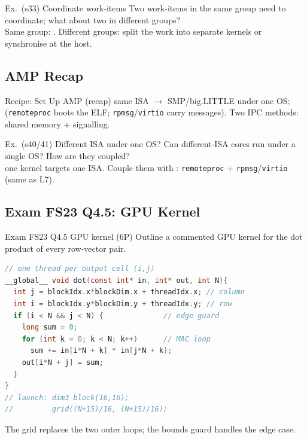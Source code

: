 \begin{example2}{Ex.\ (s33) Coordinate work-items}
    Two work-items in the same group need to coordinate; what about two in different groups?
     \\ 
    Same group: . Different groups:  split the work into separate kernels or synchronise at the host.
\end{example2}

\subsection{AMP Recap}

\begin{KR}{Recipe: Set Up AMP (recap)}
    same ISA $\to$ SMP/big.LITTLE under one OS;  (\texttt{remoteproc} boots the ELF; \texttt{rpmsg}/\texttt{virtio} carry messages). Two IPC methods: shared memory + signalling.
\end{KR}

\begin{example2}{Ex.\ (s40/41) Different ISA under one OS?}
    Can different-ISA cores run under a single OS? How are they coupled?
     \\ 
     one kernel targets one ISA. Couple them with : \texttt{remoteproc} + \texttt{rpmsg}/\texttt{virtio} (same as L7).
\end{example2}

\subsection{Exam FS23 Q4.5: GPU Kernel}

\begin{example2}{Exam FS23 Q4.5 GPU kernel (6P)}
    Outline a commented GPU kernel for the dot product of every row-vector pair.
     \\ 
\begin{lstlisting}[language=C, style=basesmol]
// one thread per output cell (i,j)
__global__ void dot(const int* in, int* out, int N){
  int j = blockIdx.x*blockDim.x + threadIdx.x; // column
  int i = blockIdx.y*blockDim.y + threadIdx.y; // row
  if (i < N && j < N) {              // edge guard
    long sum = 0;
    for (int k = 0; k < N; k++)      // MAC loop
      sum += in[i*N + k] * in[j*N + k];
    out[i*N + j] = sum;
  }
}
// launch: dim3 block(16,16);
//         grid((N+15)/16, (N+15)/16);
\end{lstlisting}
    The grid replaces the two outer loops; the bounds guard handles the edge case.
\end{example2}
